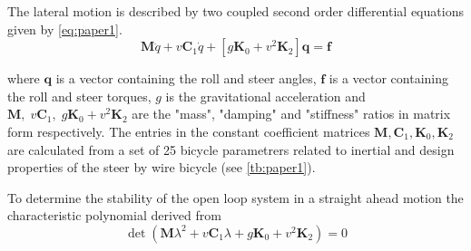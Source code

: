 The lateral motion is described by  two coupled second order differential equations given by \cref{eq:paper1}.
\begin{equation}
    \mathbf{M} \ddot{q}+v \mathbf{C}_{1} \dot{q}+\left[g \mathbf{K}_{0}+v^{2} \mathbf{K}_{2}\right] \mathbf{q}=\mathbf{f}
    \label{eq:paper1}
\end{equation}

where \ensuremath{\mathbf{q}} is a vector containing the roll and steer angles, \ensuremath{\mathbf{f}} is a vector containing the roll and steer torques, \ensuremath{g} is the gravitational acceleration and \ensuremath{\mathbf{M},\;v\mathbf{C}_{1},\;g \mathbf{K}_{0}+v^{2} \mathbf{K}_{2}} are the "mass", "damping" and "stiffness" ratios in matrix form respectively. The entries in the constant coefficient matrices  \ensuremath{\mathbf{M},\mathbf{C}_{1}, \mathbf{K}_{0},  \mathbf{K}_{2}} are calculated from a set of 25 bicycle parametrers related to inertial and design properties of the steer by wire bicycle (see \cref{tb:paper1}).

To determine the stability of the open loop system in a straight ahead motion the characteristic polynomial derived from
\begin{equation}
    \operatorname{det}\left(\mathbf{M} \lambda^{2}+v \mathbf{C}_{1} \lambda+g \mathbf{K}_{0}+v^{2} \mathbf{K}_{2}\right)=0
    \label{eq:paper2}
\end{equation}

